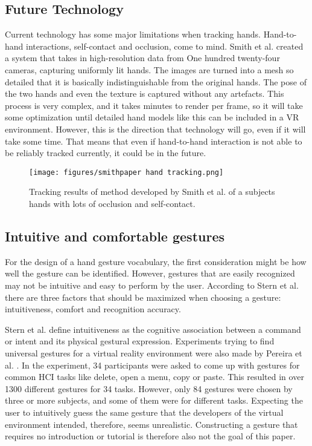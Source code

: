 \subsection{Future Technology}\label{future-technology}

Current technology has some major limitations when tracking hands.
Hand-to-hand interactions, self-contact and occlusion, come to mind.
Smith et al. \cite{Smith} created a system that takes in high-resolution data from
One hundred twenty-four cameras, capturing uniformly lit hands. The images are turned into a
mesh so detailed that it is basically indistinguishable from the original
hands. The pose of the two hands and even the texture is captured without
any artefacts. This process is very complex, and it takes minutes to
render per frame, so it will take some optimization until detailed hand
models like this can be included in a VR environment. However, this is
the direction that technology will go, even if it will take some time.
That means that even if hand-to-hand interaction is not able to be
reliably tracked currently, it could be in the future.

\begin{figure}[hbt!]
  \centering
  \texttt{[image: figures/smithpaper hand tracking.png]}
  \caption{Tracking results of method developed by Smith et al. \cite{Smith} of a subjects hands with lots of occlusion and self-contact.}
  \label{fig:elixir}
\end{figure}


\subsection{Intuitive and comfortable gestures}\label{ergonomics}
For the design of a hand gesture vocabulary, the first consideration might be how well the gesture can be identified. However, gestures that are easily recognized may not be intuitive and easy to perform by the user. According to Stern et al. \cite{Stern2006} there are three factors that should be maximized when choosing a gesture: intuitiveness, comfort and recognition accuracy.

Stern et al. define intuitiveness as the cognitive association between a command or intent and its physical gestural expression. Experiments trying to find universal gestures for a virtual reality environment were also made by Pereira et al. \cite{Pereira2015}. In the experiment, 34 participants were asked to come up with gestures for common HCI tasks like delete, open a menu, copy or paste.
This resulted in over 1300 different gestures for 34 tasks. However, only 84 gestures were chosen by three or more subjects, and some of them were for different tasks. Expecting the user to intuitively guess the same gesture that the developers of the virtual environment intended, therefore, seems unrealistic. Constructing a gesture that requires no introduction or tutorial is therefore also not the goal of this paper.

